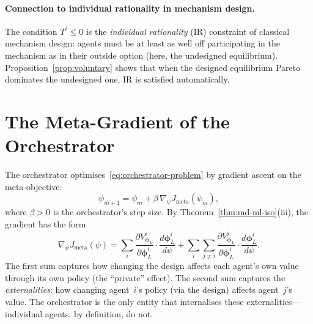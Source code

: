 \paragraph{Connection to individual rationality in mechanism design.} The condition $T^i \leq 0$ is the \emph{individual rationality} (IR) constraint of classical mechanism design: agents must be at least as well off participating in the mechanism as in their outside option (here, the undesigned equilibrium). Proposition~\ref{prop:voluntary} shows that when the designed equilibrium Pareto dominates the undesigned one, IR is satisfied automatically.

\section{The Meta-Gradient of the Orchestrator}
\label{sec:orchestrator-gradient}

The orchestrator optimises~\eqref{eq:orchestrator-problem} by gradient ascent on the meta-objective:
\begin{equation}\label{eq:orchestrator-update}
  \psi_{m+1} = \psi_m + \beta\,\nabla_\psi J_{\mathrm{meta}}(\psi_m),
\end{equation}
where $\beta > 0$ is the orchestrator's step size. By Theorem~\ref{thm:md-ml-iso}(iii), the gradient has the form
\begin{equation}\label{eq:orchestrator-gradient-expanded}
  \nabla_\psi J_{\mathrm{meta}}(\psi) = \sum_i \frac{\partial V^i_{\bm{\phi}_L}}{\partial \bm{\phi}_L^i}\cdot\frac{d\bm{\phi}_L^i}{d\psi} + \sum_i \sum_{j \neq i} \frac{\partial V^j_{\bm{\phi}_L}}{\partial \bm{\phi}_L^i}\cdot\frac{d\bm{\phi}_L^i}{d\psi}.
\end{equation}
The first sum captures how changing the design affects each agent's own value through its own policy (the ``private'' effect). The second sum captures the \emph{externalities}: how changing agent~$i$'s policy (via the design) affects agent~$j$'s value. The orchestrator is the only entity that internalises these externalities---individual agents, by definition, do not.

